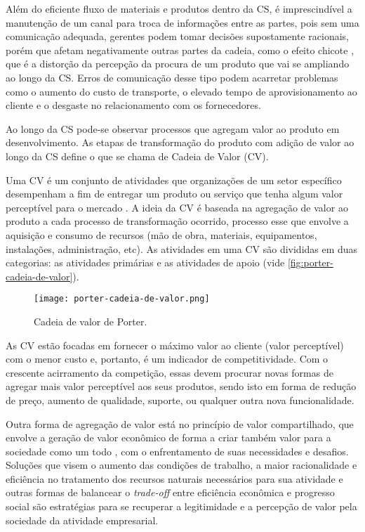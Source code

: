 Além do eficiente fluxo de materiais e produtos dentro da CS, é imprescindível a manutenção de um canal para troca de informações entre as partes, pois sem uma comunicação adequada, gerentes podem tomar decisões supostamente racionais, porém que afetam negativamente outras partes da cadeia, como o efeito chicote \cite{lee1997bullwhip}, que é a distorção da percepção da procura de um produto que vai se ampliando ao longo da CS. Erros de comunicação desse tipo podem acarretar problemas como o aumento do custo de transporte, o elevado tempo de aprovisionamento ao cliente e o desgaste no relacionamento com os fornecedores.

Ao longo da CS pode-se observar processos que agregam valor ao produto em desenvolvimento. As etapas de transformação do produto com adição de valor ao longo da CS define o que se chama de Cadeia de Valor (CV).

Uma CV é um conjunto de atividades que organizações de um setor específico desempenham a fim de entregar um produto ou serviço que tenha algum valor perceptível para o mercado \cite{porter1985competitiveadvantage}. A ideia da CV é baseada na agregação de valor ao produto a cada processo de transformação ocorrido, processo esse que envolve a aquisição e consumo de recursos (mão de obra, materiais, equipamentos, instalações, administração, etc). As atividades em uma CV são divididas em duas categorias: as atividades primárias e as atividades de apoio \cite{porter1985competitiveadvantage} (vide \autoref{fig:porter-cadeia-de-valor}).

\begin{figure}[htb]
	\centering
	\texttt{[image: porter-cadeia-de-valor.png]}
	\caption{Cadeia de valor de Porter.}
	\label{fig:porter-cadeia-de-valor}
\end{figure}

As CV estão focadas em fornecer o máximo valor ao cliente (valor perceptível) com o menor custo e, portanto, é um indicador de competitividade. Com o crescente acirramento da competição, essas devem procurar novas formas de agregar mais valor perceptível aos seus produtos, sendo isto em forma de redução de preço, aumento de qualidade, suporte, ou qualquer outra nova funcionalidade.

Outra forma de agregação de valor está no princípio de valor compartilhado, que envolve a geração de valor econômico de forma a criar também valor para a sociedade como um todo \cite{porter2011valorcompartilhado}, com o enfrentamento de suas necessidades e desafios. Soluções que visem o aumento das condições de trabalho, a maior racionalidade e eficiência no tratamento dos recursos naturais necessários para sua atividade e outras formas de balancear o \textit{trade-off} entre eficiência econômica e progresso social são estratégias para se recuperar a legitimidade e a percepção de valor pela sociedade da atividade empresarial.

